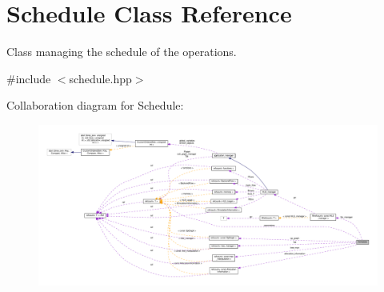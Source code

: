 \hypertarget{classSchedule}{}\section{Schedule Class Reference}
\label{classSchedule}


Class managing the schedule of the operations.  




{\ttfamily \#include $<$schedule.\+hpp$>$}



Collaboration diagram for Schedule\+:
\nopagebreak
\begin{figure}[H]
\begin{center}
\leavevmode
\includegraphics[width=350pt]{df/dfb/classSchedule__coll__graph}
\end{center}
\end{figure}
